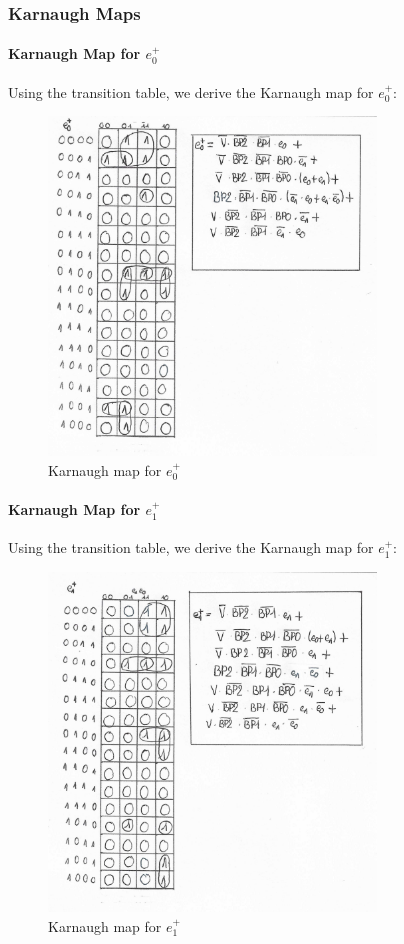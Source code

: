 \newpage
\subsubsection{Karnaugh Maps}
\paragraph{Karnaugh Map for $e_0^+$}
Using the transition table, we derive the Karnaugh map for $e_0^+$:

\begin{figure}[H]
\centering
\includegraphics[height=9cm]{img/karnaugh_e0.jpg}
\caption{Karnaugh map for $e_0^+$}
\end{figure}

\paragraph{Karnaugh Map for $e_1^+$}
Using the transition table, we derive the Karnaugh map for $e_1^+$:

\begin{figure}[H]
\centering
\includegraphics[height=9cm]{img/karnaugh_e1.jpg}
\caption{Karnaugh map for $e_1^+$}
\end{figure}

